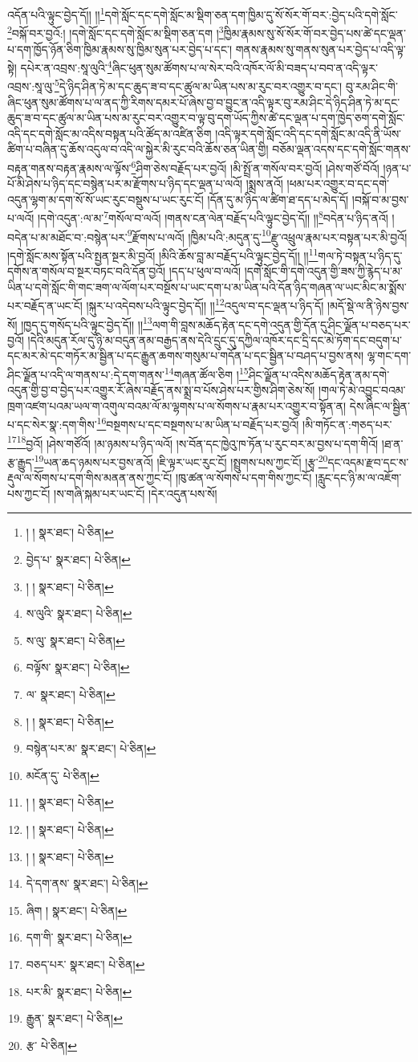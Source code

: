 འདོན་པའི་ལྟུང་བྱེད་དོ།། །།\footnote{། །  སྣར་ཐང་།  པེ་ཅིན། }དགེ་སློང་དང་དགེ་སློང་མ་སྡིག་ཅན་དག་ཁྱིམ་དུ་སོ་སོར་གོ་བར་:བྱེད་པའི་དགེ་སློང་\footnote{བྱེད་པ་  སྣར་ཐང་།  པེ་ཅིན། }བསྐོ་བར་བྱའོ:། །དགེ་སློང་དང་དགེ་སློང་མ་སྡིག་ཅན་དག །\footnote{། །  སྣར་ཐང་།  པེ་ཅིན། }ཁྱིམ་རྣམས་སུ་སོ་སོར་གོ་བར་བྱེད་པས་ཚེ་དང་ལྡན་པ་དག་ཁྱོད་ཉོན་ཅིག་ཁྱིམ་རྣམས་སུ་ཁྱིམ་སུན་པར་བྱེད་པ་དང་། གནས་རྣམས་སུ་གནས་སུན་པར་བྱེད་པ་འདི་ལྟ་སྟེ། དཔེར་ན་འབྲས་:སཱ་ལུའི་\footnote{ས་ལུའི་  སྣར་ཐང་།  པེ་ཅིན། }ཞིང་ཕུན་སུམ་ཚོགས་པ་ལ་སེར་བའི་འཁོར་ལོ་མི་བཟད་པ་བབ་ན་འདི་ལྟར་འབྲས་:སཱ་ལུ་\footnote{ས་ལུ་  སྣར་ཐང་།  པེ་ཅིན། }དེ་ཉིད་ཤིན་ཏེ་མ་དང་ཆུད་ཟ་བ་དང་ཚུལ་མ་ཡིན་པས་མ་རུང་བར་འགྱུར་བ་དང་། བུ་རམ་ཤིང་གི་ཞིང་ཕུན་སུམ་ཚོགས་པ་ལ་ནད་ཀྱི་རིགས་དམར་པོ་ཞེས་བྱ་བ་བྱུང་ན་འདི་ལྟར་བུ་རམ་ཤིང་དེ་ཉིད་ཤིན་ཏེ་མ་དང་ཆུད་ཟ་བ་དང་ཚུལ་མ་ཡིན་པས་མ་རུང་བར་འགྱུར་བ་ལྟ་བུ་དག་ཡོད་ཀྱིས་ཚེ་དང་ལྡན་པ་དག་ཁྱེད་ཅག་དགེ་སློང་འདི་དང་དགེ་སློང་མ་འདིས་བསྟན་པའི་ཚོད་མ་འཛིན་ཅིག །འདི་ལྟར་དགེ་སློང་འདི་དང་དགེ་སློང་མ་འདི་ནི་ཡོས་ཚིག་པ་བཞིན་དུ་ཆོས་འདུལ་བ་འདི་ལ་སྐྱེར་མི་རུང་བའི་ཆོས་ཅན་ཡིན་གྱི། བཅོམ་ལྡན་འདས་དང་དགེ་སློང་གནས་བརྟན་གནས་བརྟན་རྣམས་ལ་ལྟོས་\footnote{བལྟོས་  སྣར་ཐང་།  པེ་ཅིན། }ཤིག་ཅེས་བརྗོད་པར་བྱའོ། །མི་སྤྲོ་ན་གསོལ་བར་བྱའོ། །ཤེས་གཙོ་བོའོ། །ཉན་པ་པོ་མི་ཤེས་པ་ཉིད་དང་བསྙེན་པར་མ་རྫོགས་པ་ཉིད་དང་ལྡན་པ་ལའོ། །སྨྲས་ནའོ། །ཕམ་པར་འགྱུར་བ་དང་དགེ་འདུན་ལྷག་མ་དག་སོ་སོ་ཡང་རུང་བསྡུས་པ་ཡང་རུང་ངོ། །དོན་དུ་མ་ཉིད་ལ་ཚིག་ཐ་དད་པ་མེད་དོ། །བསྐོ་བ་མ་བྱས་པ་ལའོ། །དགེ་འདུན་:ལ་མ་\footnote{ལ་  སྣར་ཐང་།  པེ་ཅིན། }གསོལ་བ་ལའོ། །གནས་ངན་ལེན་བརྗོད་པའི་ལྟུང་བྱེད་དོ།། །།\footnote{། །  སྣར་ཐང་།  པེ་ཅིན། }བདེན་པ་ཉིད་ནའོ། །བདེན་པ་མ་མཐོང་བ་:བསྙེན་པར་\footnote{བསྙེན་པར་མ་  སྣར་ཐང་།  པེ་ཅིན། }རྫོགས་པ་ལའོ། །ཁྱིམ་པའི་:མདུན་དུ་\footnote{མངོན་དུ་  པེ་ཅིན། }རྫུ་འཕྲུལ་རྣམ་པར་བསྟན་པར་མི་བྱའོ། །དགེ་སློང་མས་སྟོན་པའི་སྤྱན་སྔར་མི་བྱའོ། །མིའི་ཆོས་བླ་མ་བརྗོད་པའི་ལྟུང་བྱེད་དོ།། །།\footnote{། །  སྣར་ཐང་།  པེ་ཅིན། }གལ་ཏེ་བསྟན་པ་ཉིད་དུ་དགོས་ན་གསོལ་བ་སྔར་བཏང་བའི་དོན་བྱའོ། །དད་པ་ཕུལ་བ་ལའོ། །དགེ་སློང་གི་དགེ་འདུན་གྱི་ཟས་ཀྱི་རྙེད་པ་མ་ཡིན་པ་དགེ་སློང་གི་གང་ཟག་ལ་ལོག་པར་བསྔོས་པ་ཡང་དག་པ་མ་ཡིན་པའི་དོན་ཉིད་གཞན་ལ་ཡང་མིང་མ་སྨོས་པར་བརྗོད་ན་ཡང་ངོ། །སྐུར་པ་འདེབས་པའི་ལྟུང་བྱེད་དོ།། །།\footnote{། །  སྣར་ཐང་།  པེ་ཅིན། }འདུལ་བ་དང་ལྡན་པ་ཉིད་དོ། །མདོ་སྡེ་ལ་ནི་ཉེས་བྱས་སོ། །ཁྱད་དུ་གསོད་པའི་ལྟུང་བྱེད་དོ།། །།\footnote{། །  སྣར་ཐང་།  པེ་ཅིན། }ལག་གི་བླས་མཆོད་རྟེན་དང་དགེ་འདུན་གྱི་དོན་དུ་ཤིང་ལྗོན་པ་བཅད་པར་བྱའོ། །དེའི་མདུན་རོལ་དུ་ཉི་མ་བདུན་ནམ་བརྒྱད་ནས་དེའི་དྲུང་དུ་དཀྱིལ་འཁོར་དང་དྲི་དང་མེ་ཏོག་དང་བདུག་པ་དང་མར་མེ་དང་གཏོར་མ་སྦྱིན་པ་དང་རྒྱུན་ཆགས་གསུམ་པ་གདོན་པ་དང་སྦྱིན་པ་བཤད་པ་བྱས་ནས། ལྷ་གང་དག་ཤིང་ལྗོན་པ་འདི་ལ་གནས་པ་:དེ་དག་གནས་\footnote{དེ་དག་ནས་  སྣར་ཐང་།  པེ་ཅིན། }གཞན་ཚོལ་ཅིག །\footnote{ཞིག །  སྣར་ཐང་།  པེ་ཅིན། }ཤིང་ལྗོན་པ་འདིས་མཆོད་རྟེན་ནམ་དགེ་འདུན་གྱི་བྱ་བ་བྱེད་པར་འགྱུར་རོ་ཞེས་བརྗོད་ནས་སྨྲ་བ་པོས་ཤེས་པར་གྱིས་ཤིག་ཅེས་སོ། །གལ་ཏེ་མེ་འབྱུང་བའམ་ཁྲག་འཛག་པའམ་ཡལ་ག་འགུལ་བའམ་ལོ་མ་ལྷགས་པ་ལ་སོགས་པ་རྣམ་པར་འགྱུར་བ་སྟོན་ན། དེས་ཞིང་ལ་སྦྱིན་པ་དང་སེར་སྣ་:དག་གིས་\footnote{དག་གི་  སྣར་ཐང་།  པེ་ཅིན། }བསྔགས་པ་དང་བསྔགས་པ་མ་ཡིན་པ་བརྗོད་པར་བྱའོ། །མི་གཏོང་ན་:གཅད་པར་\footnote{བཅད་པར་  སྣར་ཐང་།  པེ་ཅིན། }\footnote{པར་མི་  སྣར་ཐང་།  པེ་ཅིན། }བྱའོ། །ཤེས་གཙོའོ། །མ་ཉམས་པ་ཉིད་ལའོ། །ས་བོན་དང་ཁྱེའུ་ཁ་ཏོན་པ་རུང་བར་མ་བྱས་པ་དག་གིའོ། །ཐ་ན་རྩ་རྒྱུད་\footnote{རྒྱུན་  སྣར་ཐང་།  པེ་ཅིན། }ཡན་ཆད་ཉམས་པར་བྱས་ནའོ། །ཇི་ལྟར་ཡང་རུང་ངོ། །སྤྲུགས་པས་ཀྱང་ངོ། །རྩྭ་\footnote{རྩ་  པེ་ཅིན། }དང་འདམ་རྫབ་དང་ས་རྡུལ་ལ་སོགས་པ་དག་གིས་མནན་ནས་ཀྱང་ངོ། །ཁུ་ཚན་ལ་སོགས་པ་དག་གིས་ཀྱང་ངོ། །རླུང་དང་ཉི་མ་ལ་འཇོག་པས་ཀྱང་ངོ། །ས་གཞི་སྐམ་པར་ཡང་ངོ། །དེར་འདུན་པས་སོ། 